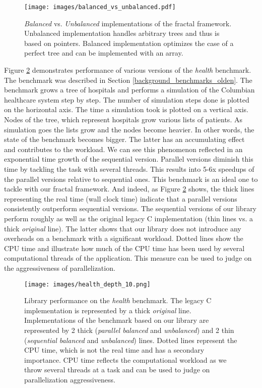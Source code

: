 \begin{figure}[!htb]
\texttt{[image: images/balanced\_vs\_unbalanced.pdf]}
\caption{\textit{Balanced} vs. \textit{Unbalanced} implementations of the fractal framework. Unbalanced implementation handles arbitrary trees and thus is based on pointers. Balanced implementation optimizes the case of a perfect tree and can be implemented with an array.}
\label{fig:balanced_vs_unbalanced}
\end{figure}\newline\null
\quad Figure \ref{fig:performance_health} demonstrates performance of various versions of the \textit{health} benchmark. The benchmark was described in Section \ref{background_benchmarks_olden}. The benchmark grows a tree of hospitals and performs a simulation of the Columbian healthcare system step by step. The number of simulation steps done is plotted on the horizontal axis. The time a simulation took is plotted on a vertical axis. Nodes of the tree, which represent hospitals grow various lists of patients. As simulation goes the lists grow and the nodes become heavier. In other words, the state of the benchmark becomes bigger. The latter has an accumulating effect and contributes to the workload. We can see this phenomenon reflected in an exponential time growth of the sequential version. Parallel versions diminish this time by tackling the task with several threads. This results into 5-6x speedups of the parallel versions relative to sequential ones. This benchmark is an ideal one to tackle with our fractal framework. And indeed, as Figure \ref{fig:performance_health} shows, the thick lines representing the real time (wall clock time) indicate that a parallel versions consistently outperform sequential versions. The sequential versions of our library perform roughly as well as the original legacy C implementation (thin lines vs. a thick \textit{original} line). The latter shows that our library does not introduce any overheads on a benchmark with a significant workload. Dotted lines show the CPU time and illustrate how much of the CPU time has been used by several computational threads of the application. This measure can be used to judge on the aggressiveness of parallelization. 
\begin{figure}[!htb]
\texttt{[image: images/health\_depth\_10.png]}
\caption{Library performance on the \textit{health} benchmark. The legacy C implementation is represented by a thick \textit{original} line. Implementations of the benchmark based on our library are represented by 2 thick (\textit{parallel balanced} and \textit{unbalanced}) and 2 thin (\textit{sequential balanced} and \textit{unbalanced}) lines. Dotted lines represent the CPU time, which is not the real time and has a secondary importance. CPU time reflects the computational workload as we throw several threads at a task and can be used to judge on parallelization aggressiveness.}
\label{fig:performance_health}
\end{figure}\newline\null
